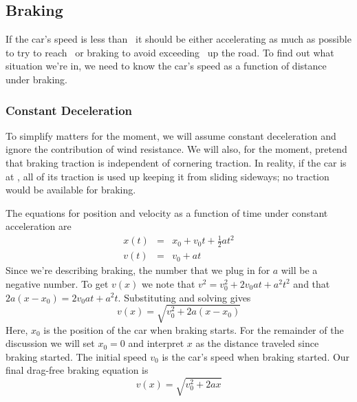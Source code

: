 \documentclass{article}
\begin{document}
\subsection{Braking}
If the car's speed is less than \vmax\ it should be either accelerating as much
as possible to try to reach \vmax\ or braking to avoid exceeding \vmax\ up the
road.  To find out what situation we're in, we need to know the car's speed as a
function of distance under braking.  

\subsubsection{Constant Deceleration}
To simplify matters for the moment, we will
assume constant deceleration and ignore the contribution of wind resistance.  We
will also, for the moment, pretend that braking traction is independent of
cornering traction.  In reality, if the car is at \vmax, all of its traction is
used up keeping it from sliding sideways; no traction would be available for
braking.

The equations for position and velocity as a function of time under constant
acceleration are
\begin{eqnarray}
  x(t) & = & x_0 + v_0t + \frac{1}{2}at^2 \\
  v(t) & = & v_0 + at 
\end{eqnarray}
Since we're describing braking, the number that we plug in for $a$ will be a
negative number.  To get $v(x)$ we note that $v^2 = v_0^2 + 2v_0at + a^2t^2$ and
that $2a(x - x_0) = 2v_0at + a^2t$.  Substituting and solving gives
\begin{equation}
  v(x) = \sqrt{v_0^2 + 2a(x - x_0)}
\end{equation}
Here, $x_0$ is the position of the car when braking starts.  For the remainder
of the discussion we will set $x_0 = 0$ and interpret $x$ as the distance
traveled since braking started.  The initial speed $v_0$ is the car's speed when
braking started.  Our final drag-free braking equation is
\begin{equation}
  \label{eq:braking-1}
  v(x) = \sqrt{v_0^2 + 2ax}
\end{equation}
\end{document}

